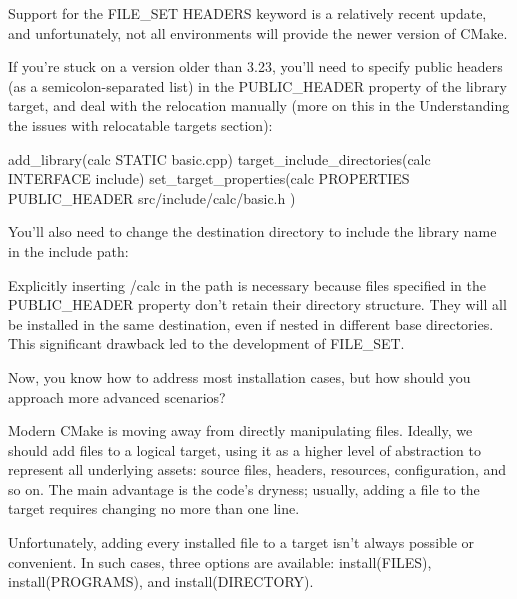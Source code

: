 Support for the FILE\_SET HEADERS keyword is a relatively recent update, and unfortunately, not all environments will provide the newer version of CMake.

If you’re stuck on a version older than 3.23, you’ll need to specify public headers (as a semicolon-separated list) in the PUBLIC\_HEADER property of the library target, and deal with the relocation manually (more on this in the Understanding the issues with relocatable targets section):


\begin{cmake}
add_library(calc STATIC basic.cpp)
target_include_directories(calc INTERFACE include)
set_target_properties(calc PROPERTIES
    PUBLIC_HEADER src/include/calc/basic.h
)
\end{cmake}

You’ll also need to change the destination directory to include the library name in the include path:



Explicitly inserting /calc in the path is necessary because files specified in the PUBLIC\_HEADER property don’t retain their directory structure. They will all be installed in the same destination, even if nested in different base directories. This significant drawback led to the development of FILE\_SET.

Now, you know how to address most installation cases, but how should you approach more advanced scenarios?


Modern CMake is moving away from directly manipulating files. Ideally, we should add files to a logical target, using it as a higher level of abstraction to represent all underlying assets: source files, headers, resources, configuration, and so on. The main advantage is the code’s dryness; usually, adding a file to the target requires changing no more than one line.

Unfortunately, adding every installed file to a target isn’t always possible or convenient. In such cases, three options are available: install(FILES), install(PROGRAMS), and install(DIRECTORY).

